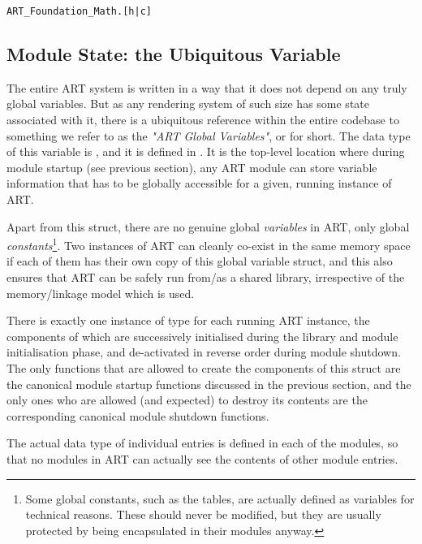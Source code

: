 \begin{verbatim}
ART_Foundation_Math.[h|c]
\end{verbatim}

\subsection{Module State: the Ubiquitous Variable  }

The entire ART system is written in a way that it does not depend on any truly global variables. But as any rendering system of such size has some state associated with it, there is a ubiquitous reference within the entire codebase to something we refer to as the \emph{"ART Global Variables"}, or  for short. The data type of this variable is , and it is defined in . It is the top-level location where during module startup (see previous section), any ART module can store variable information that has to be globally accessible for a given, running instance of ART.

Apart from this struct, there are no genuine global \emph{variables} in ART, only global \emph{constants}\footnote{Some global constants, such as the  tables, are actually defined as variables for technical reasons. These should never be modified, but they are usually protected by being encapsulated in their modules anyway.}. Two instances of ART can cleanly co-exist in the same memory space if each of them has their own copy of this global variable struct, and this also ensures that ART can be safely run from/as a shared library, irrespective of the memory/linkage model which is used.

There is exactly one instance of type  for each running ART instance, the components of which are successively initialised during the library and module initialisation phase, and de-activated in reverse order during module shutdown. The only functions that are allowed to create the components of this struct are the canonical module startup functions discussed in the previous section, and the only ones who are allowed (and expected) to destroy its contents are the corresponding canonical module shutdown functions.

The actual data type of individual  entries is defined in each of the modules, so that no modules in ART can actually see the contents of other module  entries.

